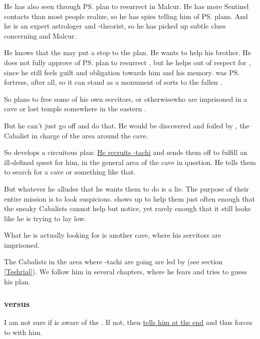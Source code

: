 \begin{garbage}
He has also seen through \ps{\Secherdamon} plan to resurrect \Nithdornazsh{} in Malcur. 
He has more Sentinel contacts than most people realize, so he has spies telling him of \ps{\Secherdamon} plans. 
And he is an expert astrologer and \matrix-theorist, so he has picked up subtle clues concerning \Nithdornazsh{} and Malcur. 

He knows that the \ghobaleth{} may put a stop to the plan. 
He wants to help his brother.
He does not fully approve of \ps{\Secherdamon} plan to resurrect \Nithdornazsh, but he helps out of respect for \hs{\Nexagglachel}, since he still feels guilt and obligation towards him and his memory. 
\Nithd{} was \ps{\Nexagglachel}{} fortress, after all, so it can stand as a monument of sorts to the fallen \dragonking.

So \Ishnaruchaefir{} plans to free some of his own servitors\dash\pdaemons, \dragons{} or otherwise\dash who are imprisoned in a cave or lost temple somewhere in the eastern \PelidorContinent. 

But he can't just go off and do that. He would be discovered and foiled by \hs{\Teshrial}, the Cabalist in charge of the area around the cave. 

So \Ishnaruchaefir{} develops a circuitous plan: 
\hyperref[Ishnaruchaefir recruits Shilred-tachi]{He recruits \Shilred-tachi} and sends them off to fulfill an ill-defined quest for him, in the general area of the cave in question. He tells them to search for a cave or something like that. 

But whatever he alludes that he wants them to do is a lie. The purpose of their entire mission is to look suspicious. \Ishnaruchaefir{} shows up to help them just often enough that the sneaky Cabalists cannot help but notice, yet rarely enough that it still looks like he is trying to lay low. 

What he is actually looking for is another cave, where his servitors are imprisoned. 

The Cabalists in the area where \Shilred-tachi are going are led by \Teshrial{} (see section \ref{Teshrial}). We follow him in several chapters, where he fears \Ishnaruchaefir{} and tries to guess his plan. 






\subsubsection{\Secherdamon{} versus \ghobaleth}
I am not sure if \hs{\Secherdamon} is aware of the \ghobaleth. 
If not, then \hyperref[Ishnaruchaefir tells Secherdamon of the Ghobaleth]{\Ishnaruchaefir{} tells him at the end} and thus forces \Secherdamon{} to \cooperate{} with him.


\end{garbage}
